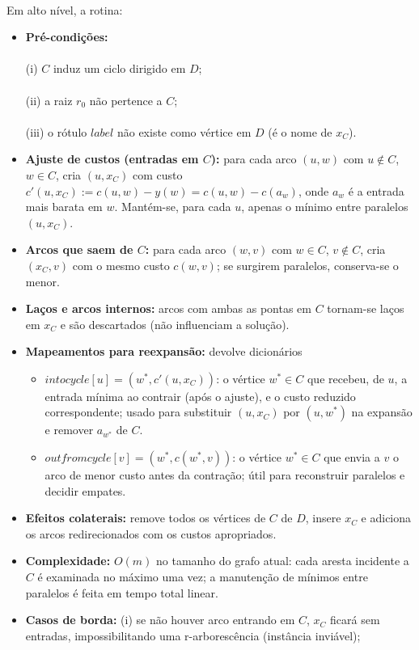 \documentclass[12pt,a4paper]{article}
\def\texttt#1{#1}%
\def\emph#1{#1}%
\def\_{}%
\begin{document}
\paragraph{} Em alto nível, a rotina:
\begin{itemize}\setlength{\itemsep}{2pt}
    \item \textbf{Pré-condições:} 
    \paragraph{}
    (i) \(C\) induz um ciclo dirigido em \(D\); 
    \paragraph{}
    (ii) a raiz \(r_0\) não pertence a \(C\); 
    \paragraph{}
    (iii) o rótulo \(\texttt{label}\) não existe como vértice em \(D\) (é o nome de \(x_C\)).
    \item \textbf{Ajuste de custos (entradas em \(C\)):} para cada arco \((u,w)\) com \(u\notin C\), \(w\in C\), cria \((u, x_C)\) com custo \(c'(u,x_C) := c(u,w) - y(w) = c(u,w) - c(a_w)\), onde \(a_w\) é a entrada mais barata em \(w\). Mantém-se, para cada \(u\), apenas o mínimo entre paralelos \((u, x_C)\).
    \item \textbf{Arcos que saem de \(C\):} para cada arco \((w,v)\) com \(w\in C\), \(v\notin C\), cria \((x_C, v)\) com o \emph{mesmo} custo \(c(w,v)\); se surgirem paralelos, conserva-se o menor.
    \item \textbf{Laços e arcos internos:} arcos com ambas as pontas em \(C\) tornam-se laços em \(x_C\) e são descartados (não influenciam a solução). 
    \item \textbf{Mapeamentos para reexpansão:} devolve dicionários
    \begin{itemize}\setlength{\itemsep}{1pt}
        \item \(\texttt{in\_to\_cycle}[u] = (w^*, c'(u,x_C))\): o vértice \(w^*\in C\) que recebeu, de \(u\), a entrada mínima ao contrair (após o ajuste), e o custo reduzido correspondente; usado para substituir \((u,x_C)\) por \((u,w^*)\) na expansão e remover \(a_{w^*}\) de \(C\).
        \item \(\texttt{out\_from\_cycle}[v] = (w^*, c(w^*,v))\): o vértice \(w^*\in C\) que envia a \(v\) o arco de menor custo antes da contração; útil para reconstruir paralelos e decidir empates.
    \end{itemize}
    \item \textbf{Efeitos colaterais:} remove todos os vértices de \(C\) de \(D\), insere \(x_C\) e adiciona os arcos redirecionados com os custos apropriados.
    \item \textbf{Complexidade:} \(O(m)\) no tamanho do grafo atual: cada aresta incidente a \(C\) é examinada no máximo uma vez; a manutenção de mínimos entre paralelos é feita em tempo total linear.
    \item \textbf{Casos de borda:} 
    (i) se não houver arco entrando em \(C\), \(x_C\) ficará sem entradas, impossibilitando uma r-arborescência (instância inviável); 

\end{itemize}
\end{document}
